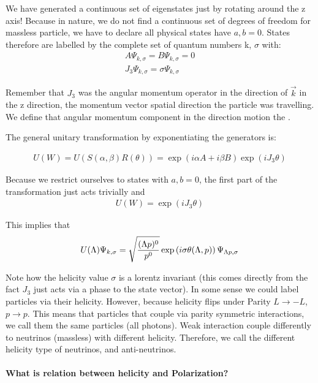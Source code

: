 \documentclass[12pt]{scrartcl}
\begin{document}
We have generated a continuous set of eigenstates just by rotating around the z axis! Because in nature, we do not find a continuous set of degrees of freedom for massless particle, we have to declare all physical states have $a, b = 0$.  States therefore are labelled by the complete set of quantum numbers k, $\sigma$ with:
\begin{align}
A \Psi_{k, \sigma} = B \Psi_{k, \sigma} = 0 \\
J_3 \Psi_{k, \sigma} = \sigma \Psi_{k, \sigma}
\end{align}

Remember that $J_3$ was the angular momentum operator in the direction of $\vec{k}$ in the z direction, the momentum vector spatial direction the particle was travelling.  We define that angular momentum component in the direction motion the
. 

The general unitary transformation by exponentiating the generators is:

\begin{align}
U(W) = U(S(\alpha, \beta) R(\theta)) = \exp (i \alpha A + i \beta B) \exp(i J_3 \theta)
\end{align}

Because we restrict ourselves to states with $a, b = 0$, the first part of the transformation just acts trivially and
\begin{align}
U(W) = \exp(i J_3 \theta)
\end{align}

This implies that 
\begin{align}
U(\Lambda) \Psi_{k, \sigma} = \sqrt{(\Lambda p)^0 \over p^0} \exp \left(i \sigma \theta(\Lambda, p) \right) \Psi_{\Lambda p, \sigma}
\end{align}

Note how the helicity value $\sigma$ is a lorentz invariant (this comes directly from the fact $J_3$ just acts via a phase to the state vector).  In some sense we could label particles via their helicity.  However, because helicity flips under Parity $L \rightarrow -L$, $ p \rightarrow p$.  This means that particles that couple via parity symmetric interactions, we call them the same particles (all photons).  Weak interaction couple differently to neutrinos (massless) with different helicity.  Therefore, we call the different helicity type of neutrinos, and anti-neutrinos.


\paragraph{What is relation between helicity and Polarization?}
\end{document}
